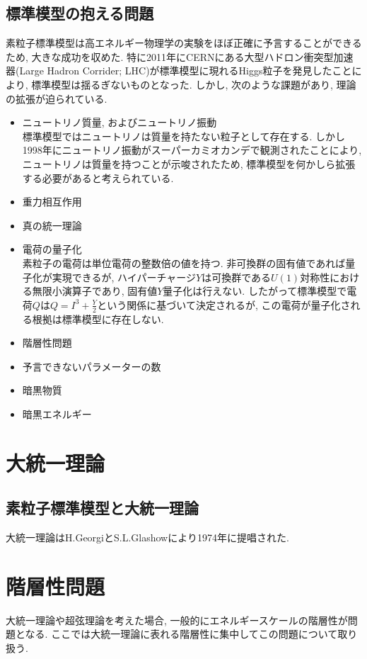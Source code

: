 \documentclass[titlepage]{jsbook}
\theoremstyle{plain}
\theoremstyle{definition}
\begin{document}
\section{標準模型の抱える問題}
素粒子標準模型は高エネルギー物理学の実験をほぼ正確に予言することができるため, 大きな成功を収めた.
特に2011年にCERNにある大型ハドロン衝突型加速器(Large Hadron Corrider; LHC)が標準模型に現れるHiggs粒子を発見したことにより, 標準模型は揺るぎないものとなった.
しかし, 次のような課題があり, 理論の拡張が迫られている.
\begin{itemize}
        \item ニュートリノ質量, およびニュートリノ振動\\
              標準模型ではニュートリノは質量を持たない粒子として存在する.
              しかし1998年にニュートリノ振動がスーパーカミオカンデで観測されたことにより, ニュートリノは質量を持つことが示唆されたため, 標準模型を何かしら拡張する必要があると考えられている.
      \item 重力相互作用
      \item 真の統一理論
      \item 電荷の量子化\\
            素粒子の電荷は単位電荷の整数倍の値を持つ.
            非可換群の固有値であれば量子化が実現できるが, ハイパーチャージ$Y$は可換群である$U(1)$対称性における無限小演算子であり, 固有値$Y$量子化は行えない.
            したがって標準模型で電荷$Q$は$Q = I^3 + \frac{Y}{2}$という関係に基づいて決定されるが, この電荷が量子化される根拠は標準模型に存在しない.
      \item 階層性問題
      \item 予言できないパラメーターの数
      \item 暗黒物質
      \item 暗黒エネルギー
\end{itemize}



\chapter{大統一理論}
\section{素粒子標準模型と大統一理論}
大統一理論はH.GeorgiとS.L.Glashowにより1974年に提唱された\cite{PhysRevLett.32.438}.


\chapter{階層性問題}
%
%
大統一理論や超弦理論を考えた場合, 一般的にエネルギースケールの階層性が問題となる.
ここでは大統一理論に表れる階層性に集中してこの問題について取り扱う.
\end{document}
